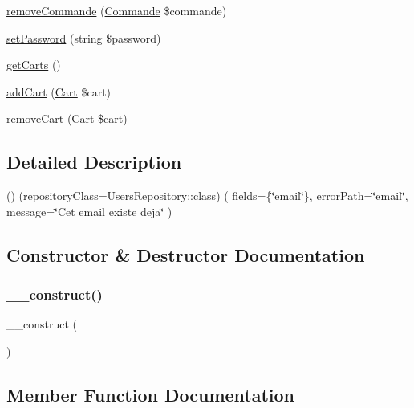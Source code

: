 \begin{DoxyCompactItemize}
\item 
\mbox{\hyperlink{class_app_1_1_entity_1_1_users_a98184ff8c042500a02552ee0cc6e305b}{remove\+Commande}} (\mbox{\hyperlink{class_app_1_1_entity_1_1_commande}{Commande}} \$commande)
\item 
\mbox{\hyperlink{class_app_1_1_entity_1_1_users_a81e0f429784973551fb5417d5b92b0db}{set\+Password}} (string \$password)
\item 
\mbox{\hyperlink{class_app_1_1_entity_1_1_users_af01723b72fddbef7e1529591b32ac96d}{get\+Carts}} ()
\item 
\mbox{\hyperlink{class_app_1_1_entity_1_1_users_ae6fc61e1d99695b1cd2907cf4efef430}{add\+Cart}} (\mbox{\hyperlink{class_app_1_1_entity_1_1_cart}{Cart}} \$cart)
\item 
\mbox{\hyperlink{class_app_1_1_entity_1_1_users_a9aff9e8abf19d0390713e9ead0968f85}{remove\+Cart}} (\mbox{\hyperlink{class_app_1_1_entity_1_1_cart}{Cart}} \$cart)
\end{DoxyCompactItemize}


\subsection{Detailed Description}
() (repository\+Class=Users\+Repository\+::class) ( fields=\{\char`\"{}email\char`\"{}\}, error\+Path=\char`\"{}email\char`\"{}, message=\char`\"{}\+Cet email existe deja\char`\"{} ) 

\subsection{Constructor \& Destructor Documentation}
\mbox{\label{class_app_1_1_entity_1_1_users_a095c5d389db211932136b53f25f39685}} 
\subsubsection{\texorpdfstring{\+\_\+\+\_\+construct()}{\_\_construct()}}
{\footnotesize\ttfamily \+\_\+\+\_\+construct (\begin{DoxyParamCaption}{ }\end{DoxyParamCaption})}



\subsection{Member Function Documentation}
\mbox{\label{class_app_1_1_entity_1_1_users_ae6fc61e1d99695b1cd2907cf4efef430}} 
